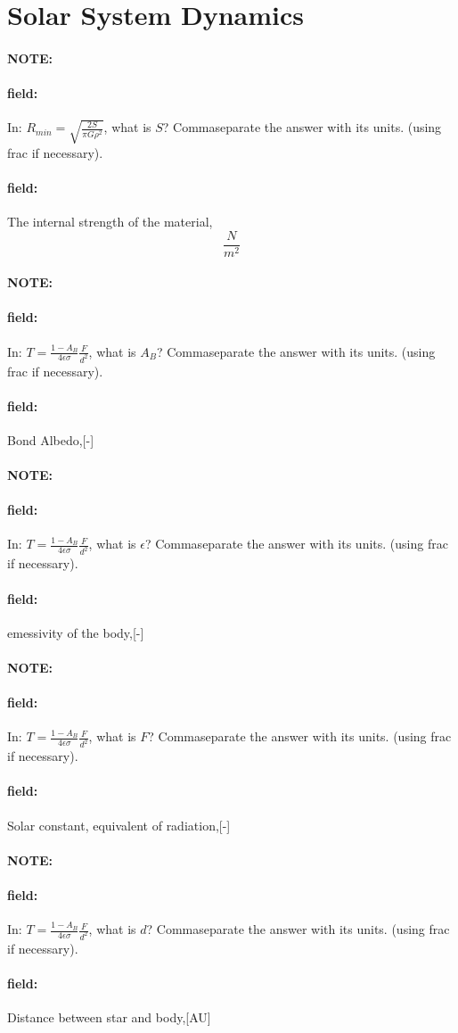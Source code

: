 \documentclass[12pt]{article}
\newenvironment{note}{\paragraph{NOTE:}}{}
\newenvironment{field}{\paragraph{field:}}{}
\begin{document}
\section{Solar System Dynamics}
\begin{note}
   \begin{field}
       In: \(R_{min}=\sqrt{\frac{2S}{\pi G \rho^2}}\), what is \(S\)? Commaseparate the answer with its units. (using frac if necessary).
   \end{field}
   \begin{field}
		The internal strength of the material,
		\[
			\frac{N}{m^2}
		\]
   \end{field}
\end{note}

\begin{note}
   \begin{field}
       In: \(T = \frac{1-A_B}{4\epsilon\sigma}\frac{F}{d^2}\), what is \(A_B\)? Commaseparate the answer with its units. (using frac if necessary).
   \end{field}
   \begin{field}
		Bond Albedo,[-]	
   \end{field}
\end{note}
\begin{note}
   \begin{field}
       In: \(T = \frac{1-A_B}{4\epsilon\sigma}\frac{F}{d^2}\), what is \(\epsilon\)? Commaseparate the answer with its units. (using frac if necessary).
   \end{field}
   \begin{field}
		emessivity of the body,[-]
   \end{field}
\end{note}
\begin{note}
   \begin{field}
       In: \(T = \frac{1-A_B}{4\epsilon\sigma}\frac{F}{d^2}\), what is \(F\)? Commaseparate the answer with its units. (using frac if necessary).
   \end{field}
   \begin{field}
		Solar constant, equivalent of radiation,[-]
   \end{field}
\end{note}
\begin{note}
   \begin{field}
       In: \(T = \frac{1-A_B}{4\epsilon\sigma}\frac{F}{d^2}\), what is \(d\)? Commaseparate the answer with its units. (using frac if necessary).
   \end{field}
   \begin{field}
		Distance between star and body,[AU]
   \end{field}
\end{note}
\end{document}
